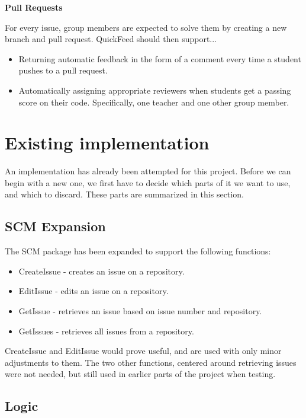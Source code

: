 \textbf{Pull Requests}

For every issue, group members are expected to solve them by creating a new branch and pull request.
QuickFeed should then support...
\begin{itemize}
    \item Returning automatic feedback in the form of a comment every time a student pushes to a pull request.
    \item Automatically assigning appropriate reviewers when students get a passing score on their code.
    Specifically, one teacher and one other group member.
\end{itemize}

\section{Existing implementation}

An implementation has already been attempted for this project. %
Before we can begin with a new one, we first have to decide which parts of it we want to use, and which to discard.
These parts are summarized in this section.

\subsection{SCM Expansion}
\label{sec:scm_expansion}

The SCM package has been expanded to support the following functions:

\begin{itemize}
    \item CreateIssue   - creates an issue on a repository.
    \item EditIssue - edits an issue on a repository.
    \item GetIssue  - retrieves an issue based on issue number and repository.
    \item GetIssues - retrieves all issues from a repository.
\end{itemize}

CreateIssue and EditIssue would prove useful, and are used with only minor adjustments to them.
The two other functions, centered around retrieving issues were not needed, but still used in earlier parts of the project when testing.

\subsection{Logic}

